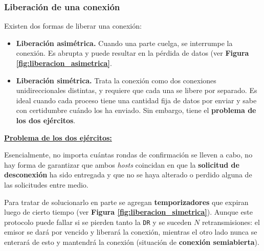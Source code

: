 \documentclass[10pt,a4paper]{article}
\begin{document}
\subsubsection{Liberación de una conexión}

Existen dos formas de liberar una conexión:

\begin{itemize}
\item \textbf{Liberación asimétrica.} Cuando una parte cuelga, se interrumpe la conexión. Es abrupta y puede resultar en la pérdida de datos (ver \textbf{Figura \ref{fig:liberacion_asimetrica}}.
\item \textbf{Liberación simétrica.} Trata la conexión como dos conexiones unidireccionales distintas, y requiere que cada una se libere por separado. Es ideal cuando cada proceso tiene una cantidad fija de datos por enviar y sabe con certidumbre cuándo los ha enviado. Sin embargo, tiene el \textbf{problema de los dos ejércitos}.
\end{itemize}

\underline{\textbf{Problema de los dos ejércitos:}}

Esencialmente, no importa cuántas rondas de confirmación se lleven a cabo, no hay forma de garantizar que ambos \textit{hosts} coincidan en que la \textbf{solicitud de desconexión} ha sido entregada y que no se haya alterado o perdido alguna de las solicitudes entre medio.

Para tratar de solucionarlo en parte se agregan \textbf{temporizadores} que expiran luego de cierto tiempo (ver \textbf{Figura \ref{fig:liberacion_simetrica}}). Aunque este protocolo puede fallar si se pierden tanto la \texttt{DR} y se suceden $N$ retransmisiones: el emisor se dará por vencido y liberará la conexión, mientras el otro lado nunca se enterará de esto y mantendrá la conexión (situación de \textbf{conexión semiabierta}). 
\end{document}
